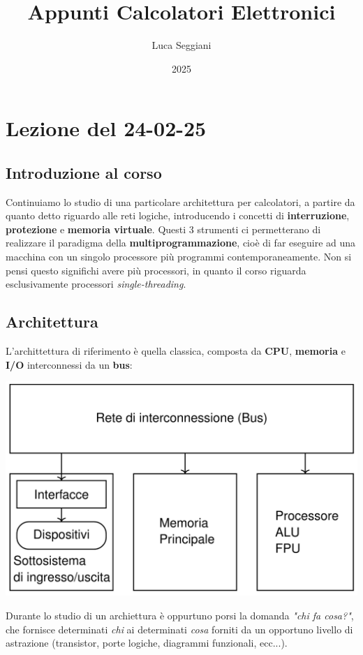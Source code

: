 \documentclass[a4paper,11pt]{article}
\title{Appunti Calcolatori Elettronici}
\author{Luca Seggiani}
\date{2025}
\begin{document}
\section{Lezione del 24-02-25}

\thispagestyle{empty}
\pagestyle{fancy}

\subsection{Introduzione al corso}
Continuiamo lo studio di una particolare architettura per calcolatori, a partire da quanto detto riguardo alle reti logiche, introducendo i concetti di \textbf{interruzione}, \textbf{protezione} e \textbf{memoria virtuale}.
Questi 3 strumenti ci permetterano di realizzare il paradigma della \textbf{multiprogrammazione}, cioè di far eseguire ad una macchina con un singolo processore più programmi contemporaneamente.
Non si pensi questo significhi avere più processori, in quanto il corso riguarda esclusivamente processori \textit{single-threading}.

\subsection{Architettura}
L'archittettura di riferimento è quella classica, composta da \textbf{CPU}, \textbf{memoria} e \textbf{I/O} interconnessi da un \textbf{bus}:

\begin{center}
	\includegraphics[scale=0.35]{../figures/struttura_calc.png}
\end{center}

Durante lo studio di un archiettura è oppurtuno porsi la domanda \textit{"chi fa cosa?"}, che fornisce determinati \textit{chi} ai determinati \textit{cosa} forniti da un opportuno livello di astrazione (transistor, porte logiche, diagrammi funzionali, ecc...).
\end{document}
